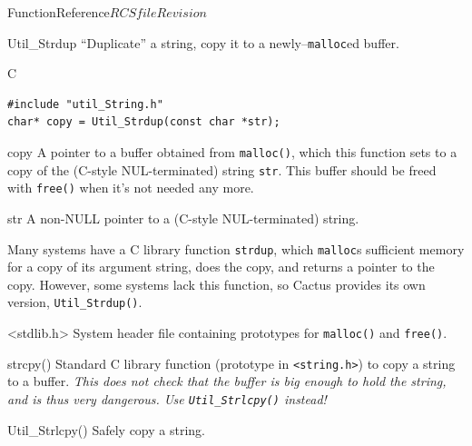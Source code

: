 \begin{cactuspart}{FunctionReference}{$RCSfile$}{$Revision$}

\begin{FunctionDescription}{Util\_Strdup}
\label{Util-Strdup}
``Duplicate'' a string, \ie{} copy it to a newly--\verb|malloc|ed buffer.

\begin{SynopsisSection}
\begin{Synopsis}{C}
\begin{verbatim}
#include "util_String.h"
char* copy = Util_Strdup(const char *str);
\end{verbatim}
\end{Synopsis}
\end{SynopsisSection}

\begin{ResultSection}
\begin{Result}{copy}
A pointer to a buffer obtained from \verb|malloc()|,
which this function sets to a copy of the (C-style NUL-terminated)
string \verb|str|.  This buffer should be freed with \verb|free()|
when it's not needed any more.
\end{Result}
\end{ResultSection}

\begin{ParameterSection}
\begin{Parameter}{str}
A non-NULL pointer to a (C-style NUL-terminated) string.
\end{Parameter}
\end{ParameterSection}

\begin{Discussion}
Many systems have a C library function \verb|strdup|, which
\verb|malloc|s sufficient memory for a copy of its argument string,
does the copy, and returns a pointer to the copy.  However, some
systems lack this function, so Cactus provides its own version,
\verb|Util_Strdup()|.
\end{Discussion}

\begin{SeeAlsoSection}
\begin{SeeAlso}{<stdlib.h>}
System header file containing prototypes for
\verb|malloc()| and \verb|free()|.
\end{SeeAlso}
\begin{SeeAlso}{strcpy()}
Standard C library function (prototype in \verb|<string.h>|)
to copy a string to a buffer.
{\em This does not check that the buffer is big enough to hold the string,
and is thus very dangerous.  Use \verb|Util_Strlcpy()| instead!}
\end{SeeAlso}
\begin{SeeAlso}{Util\_Strlcpy()}
Safely copy a string.
\end{SeeAlso}
\end{SeeAlsoSection}


\end{FunctionDescription}
\end{cactuspart}
